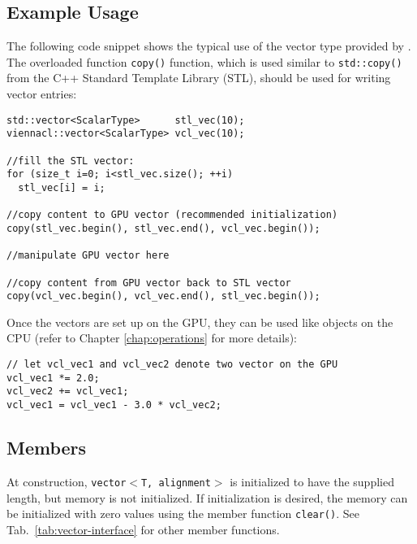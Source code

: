 \subsection{Example Usage}
The following code snippet shows the typical use of the vector type provided by
{\ViennaCL}. The overloaded function \texttt{copy()} function, which is used similar to
\lstinline|std::copy()| from the C++ Standard Template Library (STL), should be used for writing vector entries:
\begin{lstlisting}
std::vector<ScalarType>      stl_vec(10);
viennacl::vector<ScalarType> vcl_vec(10);

//fill the STL vector:
for (size_t i=0; i<stl_vec.size(); ++i)
  stl_vec[i] = i;

//copy content to GPU vector (recommended initialization)
copy(stl_vec.begin(), stl_vec.end(), vcl_vec.begin());

//manipulate GPU vector here

//copy content from GPU vector back to STL vector
copy(vcl_vec.begin(), vcl_vec.end(), stl_vec.begin());
\end{lstlisting}


Once the vectors are set up on the GPU, they can be used like objects on the CPU
(refer to Chapter \ref{chap:operations} for more details):
\begin{lstlisting}
// let vcl_vec1 and vcl_vec2 denote two vector on the GPU
vcl_vec1 *= 2.0;
vcl_vec2 += vcl_vec1;
vcl_vec1 = vcl_vec1 - 3.0 * vcl_vec2;
\end{lstlisting}

\subsection{Members}
At construction, \texttt{vector$<$T, alignment$>$} is initialized to have the
supplied length, but memory is not initialized. If initialization is desired,
the memory can be initialized with zero values using the member function
\lstinline|clear()|. See
Tab.~\ref{tab:vector-interface} for other member functions.



